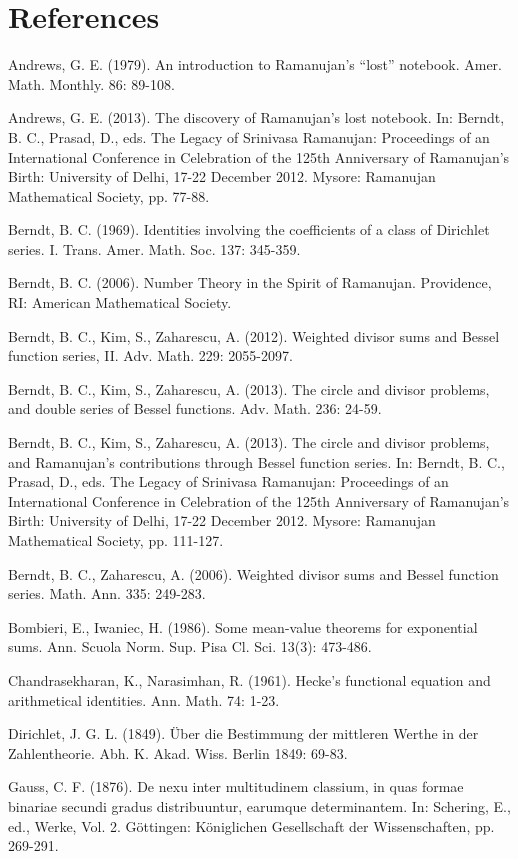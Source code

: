 \documentclass[10pt]{article}
\theoremstyle{plain}
\begin{document}
\section*{References}
\begin{list}{}{\setlength{\leftmargin}{2.7em}\setlength{\labelwidth}{2.2em}\setlength{\itemindent}{-2.7em}\setlength{\itemsep}{0.25ex}\small}
  \item[{[1]}] Andrews, G. E. (1979). An introduction to Ramanujan's ``lost'' notebook. Amer. Math. Monthly. 86: 89-108.
  \item[{[2]}] Andrews, G. E. (2013). The discovery of Ramanujan's lost notebook. In: Berndt, B. C., Prasad, D., eds. The Legacy of Srinivasa Ramanujan: Proceedings of an International Conference in Celebration of the 125th Anniversary of Ramanujan's Birth: University of Delhi, 17-22 December 2012. Mysore: Ramanujan Mathematical Society, pp. 77-88.
  \item[{[3]}] Berndt, B. C. (1969). Identities involving the coefficients of a class of Dirichlet series. I. Trans. Amer. Math. Soc. 137: 345-359.
  \item[{[4]}] Berndt, B. C. (2006). Number Theory in the Spirit of Ramanujan. Providence, RI: American Mathematical Society.
  \item[{[5]}] Berndt, B. C., Kim, S., Zaharescu, A. (2012). Weighted divisor sums and Bessel function series, II. Adv. Math. 229: 2055-2097.
  \item[{[6]}] Berndt, B. C., Kim, S., Zaharescu, A. (2013). The circle and divisor problems, and double series of Bessel functions. Adv. Math. 236: 24-59.
  \item[{[7]}] Berndt, B. C., Kim, S., Zaharescu, A. (2013). The circle and divisor problems, and Ramanujan's contributions through Bessel function series. In: Berndt, B. C., Prasad, D., eds. The Legacy of Srinivasa Ramanujan: Proceedings of an International Conference in Celebration of the 125th Anniversary of Ramanujan's Birth: University of Delhi, 17-22 December 2012. Mysore: Ramanujan Mathematical Society, pp. 111-127.
  \item[{[8]}] Berndt, B. C., Zaharescu, A. (2006). Weighted divisor sums and Bessel function series. Math. Ann. 335: 249-283.
  \item[{[9]}] Bombieri, E., Iwaniec, H. (1986). Some mean-value theorems for exponential sums. Ann. Scuola Norm. Sup. Pisa Cl. Sci. 13(3): 473-486.
  \item[{[10]}] Chandrasekharan, K., Narasimhan, R. (1961). Hecke's functional equation and arithmetical identities. Ann. Math. 74: 1-23.
  \item[{[11]}] Dirichlet, J. G. L. (1849). Über die Bestimmung der mittleren Werthe in der Zahlentheorie. Abh. K. Akad. Wiss. Berlin 1849: 69-83.
  \item[{[12]}] Gauss, C. F. (1876). De nexu inter multitudinem classium, in quas formae binariae secundi gradus distribuuntur, earumque determinantem. In: Schering, E., ed., Werke, Vol. 2. Göttingen: Königlichen Gesellschaft der Wissenschaften, pp. 269-291.
\end{list}
\end{document}

